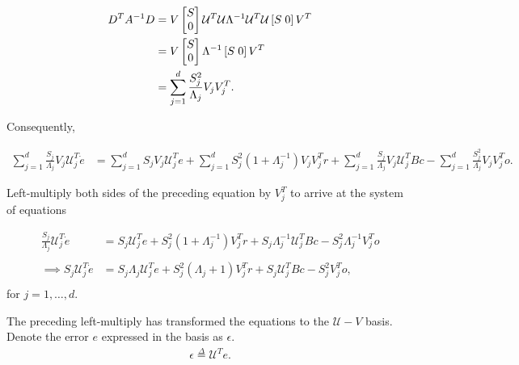 \begin{enumerate}
\begin{align*}
D^{T} A^{-1} D  &= V \begin{bmatrix} S \\ 0\end{bmatrix} \mathcal{U}^T  \mathcal{U} \Lambda^{-1} \mathcal{U}^T \mathcal{U} \left[S \hspace{1mm} 0 \right] V^T \\
  &= V \begin{bmatrix} S \\ 0\end{bmatrix} \Lambda^{-1} \left[S \hspace{1mm} 0 \right] V^T \\
  &= \sum_{j = 1}^{d} \frac{S_j^2}{ \Lambda_j} V_j V_j^T.
\end{align*}

Consequently, 

\begin{align}
    \label{eq:derivation_sub_svd}
    \sum_{j = 1}^{d} \frac{S_j}{ \Lambda_j} V_j \mathcal{U}_j^T \dot{e} &= 
     \sum_{j=1}^d S_j V_j  \mathcal{U}_j^T e
    +
    \sum_{j = 1}^{d} S_j^2 (1 + \Lambda_j^{-1}) V_j V_j^T r
    + 
    \sum_{j = 1}^{d} \frac{S_j}{ \Lambda_j} V_j \mathcal{U}_j^TBc 
    -
    \sum_{j = 1}^{d} \frac{S_j^2}{ \Lambda_j} V_j V_j^T o.
\end{align}


Left-multiply both sides of the preceding equation by $V_j^T$ to arrive at the system of equations

\begin{align*}
    \frac{S_j}{\Lambda_j} \mathcal{U}_j^T \dot{e} &= 
    S_j \mathcal{U}_j^T e
    +
    S_j^2 (1 + \Lambda_j^{-1})V_j^T r 
    +
    S_j \Lambda_j^{-1} \mathcal{U}_j^T B c
    -
    S_j^2 \Lambda_j^{-1} V_j^T o
    \\
    \\
    \implies 
    S_j \mathcal{U}_j^T \dot{e} 
    &= 
    S_j\Lambda_j \mathcal{U}_j^T e
    +
    S_j^2 (\Lambda_j + 1) V_j^T r 
    +
    S_j \mathcal{U}_j^T B c
    -
    S_j^2 V_j^T o,\\
\end{align*}
for $j = 1, \ldots, d$.

The preceding left-multiply has transformed the equations to the $\mathcal{U}-V$ basis. Denote the error $e$ expressed in the basis as $\epsilon$. 
\begin{align}
\label{eq:rotated_error_def}
\epsilon \overset{\Delta}{=} \mathcal{U}^T e.
\end{align}


\end{enumerate}
